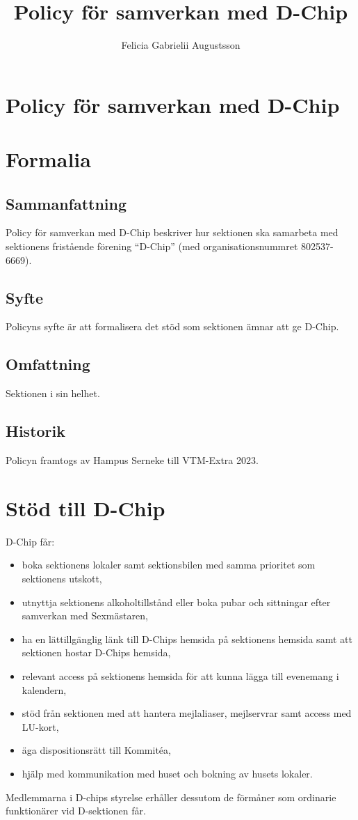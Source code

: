 \documentclass{dsekprotokoll}
\title{Policy för samverkan med D-Chip}
\author{Felicia Gabrielii Augustsson}
\begin{document}
\section*{Policy för samverkan med D-Chip}
\section{Formalia}
\subsection{Sammanfattning}
Policy för samverkan med D-Chip beskriver hur sektionen ska samarbeta med sektionens fristående förening ``D-Chip'' (med organisationsnummret 802537-6669).
\subsection{Syfte}
Policyns syfte är att formalisera det stöd som sektionen ämnar att ge D-Chip. 
\subsection{Omfattning}
Sektionen i sin helhet.

\subsection{Historik}

Policyn framtogs av Hampus Serneke till VTM-Extra 2023.

\section{Stöd till D-Chip}

D-Chip får:

\begin{itemize}
    \item boka sektionens lokaler samt sektionsbilen med samma prioritet som sektionens utskott,
    \item utnyttja sektionens alkoholtillstånd eller boka pubar och sittningar efter samverkan med Sexmästaren,
    \item ha en lättillgänglig länk till D-Chips hemsida på sektionens hemsida samt att sektionen hostar D-Chips hemsida,
    \item relevant access på sektionens hemsida för att kunna lägga till evenemang i kalendern,
    \item stöd från sektionen med att hantera mejlaliaser, mejlservrar samt access med LU-kort,
    \item äga dispositionsrätt till Kommitéa,
    \item hjälp med kommunikation med huset och bokning av husets lokaler.
\end{itemize}

Medlemmarna i D-chips styrelse erhåller dessutom de förmåner som ordinarie funktionärer vid D-sektionen får.
\end{document}
